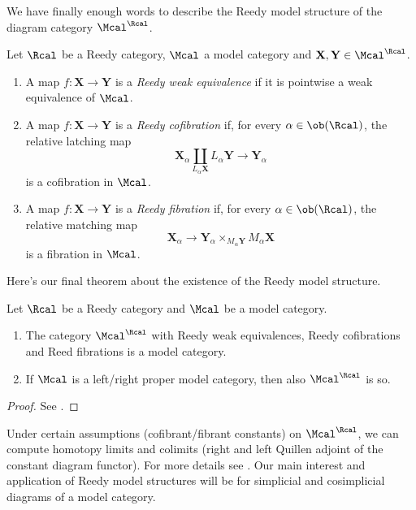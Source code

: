             We have finally enough words to describe the Reedy model structure of the diagram category $\Mcal^{\Rcal}$.
            \begin{defn}
                \label{defn:reedy_model_structure}
                Let $\Rcal$ be a Reedy category, $\Mcal$ a model category and $\mathbf{X}, \mathbf{Y} \in \Mcal^{\Rcal}$.
                \begin{enumerate}
                    \item A map $f\colon \mathbf{X} \to \mathbf{Y}$ is a \emph{Reedy weak equivalence} if it is pointwise a weak equivalence of $\Mcal$.
                    \item A map $f\colon \mathbf{X} \to \mathbf{Y}$ is a \emph{Reedy cofibration} if, for every $\alpha \in \ob(\Rcal)$, the relative latching map \[\mathbf{X}_{\alpha} \coprod_{L_{\alpha} \mathbf{X}} L_{\alpha} \mathbf{Y} \to \mathbf{Y}_{\alpha} \] is a cofibration in $\Mcal$.
                    \item A map $f\colon \mathbf{X} \to \mathbf{Y}$ is a \emph{Reedy fibration} if, for every $\alpha \in \ob(\Rcal)$, the relative matching map \[\mathbf{X}_{\alpha} \to \mathbf{Y}_{\alpha} \times_{M_{\alpha} \mathbf{Y}} M_{\alpha} \mathbf{X} \] is a fibration in $\Mcal$.
                \end{enumerate}
            \end{defn}

            Here's our final theorem about the existence of the Reedy model structure.
            \begin{thm}
                \label{thm:reedy_model_structure}
                Let $\Rcal$ be a Reedy category and $\Mcal$ be a model category. 
                \begin{enumerate}
                    \item The category $\Mcal^{\Rcal}$ with Reedy weak equivalences, Reedy cofibrations and Reed fibrations is a model category.
                    \item If $\Mcal$ is a left/right proper model category, then also $\Mcal^{\Rcal}$ is so.
                \end{enumerate}
            \end{thm}
            \begin{proof}
                See \cite[Theorem~15.3.4]{Hirs:loc}.
            \end{proof}
            Under certain assumptions (cofibrant/fibrant constants) on $\Mcal^{\Rcal}$, we can compute homotopy limits and colimits (right and left Quillen adjoint of the constant diagram functor). For more details see \cite[15.10]{Hirs:loc}.
            Our main interest and application of Reedy model structures will be for simplicial and cosimplicial diagrams of a model category.

